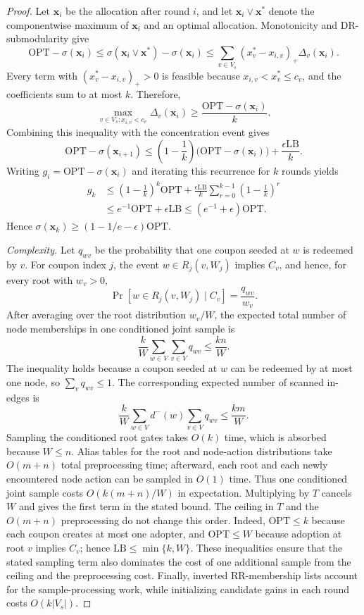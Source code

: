 \documentclass[sigconf,balance=false]{acmart}
\begin{document}
\begin{proof}
Let $\bm{x}_i$ be the allocation after round $i$, and let
$\bm{x}_i\vee\bm{x}^*$ denote the componentwise maximum of $\bm{x}_i$ and
an optimal allocation. Monotonicity and DR-submodularity give
\[
  \mathrm{OPT}-\sigma(\bm{x}_i)
  \leq \sigma(\bm{x}_i\vee\bm{x}^*)-\sigma(\bm{x}_i)
  \leq \sum_{v\in V_s}(x_v^*-x_{i,v})_+\Delta_v(\bm{x}_i).
\]
Every term with $(x_v^*-x_{i,v})_+>0$ is feasible because
$x_{i,v}<x_v^*\leq c_v$, and the coefficients sum to at most $k$.
Therefore,
\[
  \max_{v\in V_s:x_{i,v}<c_v}\Delta_v(\bm{x}_i)
  \geq \frac{\mathrm{OPT}-\sigma(\bm{x}_i)}{k}.
\]
Combining this inequality with the concentration event gives
\[
  \mathrm{OPT}-\sigma(\bm{x}_{i+1})
  \leq
  \left(1-\frac{1}{k}\right)
  \bigl(\mathrm{OPT}-\sigma(\bm{x}_i)\bigr)
  +
  \frac{\epsilon\mathrm{LB}}{k}.
\]
Writing $g_i=\mathrm{OPT}-\sigma(\bm{x}_i)$ and iterating this recurrence
for $k$ rounds yields
\begin{align*}
  g_k
  &\leq \left(1-\frac{1}{k}\right)^k\mathrm{OPT}
    +\frac{\epsilon\mathrm{LB}}{k}
      \sum_{r=0}^{k-1}\left(1-\frac{1}{k}\right)^r \\
  &\leq e^{-1}\mathrm{OPT}+\epsilon\mathrm{LB}
  \leq (e^{-1}+\epsilon)\mathrm{OPT}.
\end{align*}
Hence
$\sigma(\bm{x}_k)\geq(1-1/e-\epsilon)\mathrm{OPT}$.

\textit{Complexity.}
Let $q_{wv}$ be the probability that one coupon seeded at $w$ is redeemed
by $v$.
For coupon index $j$, the event $w\in R_j(v,W_j)$ implies $C_v$, and
hence, for every root with $w_v>0$,
\[
  \Pr[w\in R_j(v,W_j)\mid C_v]=\frac{q_{wv}}{w_v}.
\]
After averaging over the root distribution $w_v/W$, the expected total
number of node memberships in one conditioned joint sample is
\[
  \frac{k}{W}\sum_{w\in V}\sum_{v\in V}q_{wv}
  \leq\frac{kn}{W}.
\]
The inequality holds because a coupon seeded at $w$ can be redeemed by at
most one node, so $\sum_vq_{wv}\leq1$.
The corresponding expected number of scanned in-edges is
\[
  \frac{k}{W}\sum_{w\in V}d^-(w)\sum_{v\in V}q_{wv}
  \leq\frac{km}{W}.
\]
Sampling the conditioned root gates takes $O(k)$ time, which is absorbed
because $W\leq n$.
Alias tables for the root and node-action distributions take $O(m+n)$ total
preprocessing time; afterward, each root and each newly encountered node action
can be sampled in $O(1)$ time.
Thus one conditioned joint sample costs
$O(k(m+n)/W)$ in expectation.
Multiplying by $T$ cancels $W$ and gives the first term in the stated
bound.
The ceiling in $T$ and the $O(m+n)$ preprocessing do not change this order.
Indeed, $\mathrm{OPT}\leq k$ because each coupon creates at most one
adopter, and $\mathrm{OPT}\leq W$ because adoption at root $v$ implies
$C_v$; hence $\mathrm{LB}\leq\min\{k,W\}$.
These inequalities ensure that the stated sampling term also dominates the
cost of one additional sample from the ceiling and the preprocessing cost.
Finally, inverted RR-membership lists account for the sample-processing
work, while initializing candidate gains in each round costs
$O(k|V_s|)$.
\end{proof}
\end{document}
